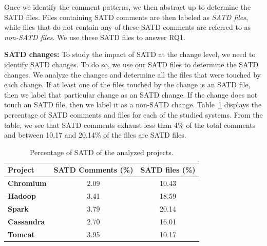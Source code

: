 Once we identify the comment patterns, we then abstract up to determine the SATD files. Files containing SATD comments are then labeled as {\em SATD files}, while files that do not contain any of these SATD comments are referred to as {\em non-SATD files}. We use these SATD files to answer RQ1.

\noindent\textbf{SATD changes:}
To study the impact of SATD at the change level, we need to identify SATD changes. To do so, we use our SATD files to determine the SATD changes. We analyze the changes and determine all the files that were touched by each change. If at least one of the files touched by the change is an SATD file, then we label that particular change as an SATD change. If the change does not touch an SATD file, then we label it as a non-SATD change. Table~\ref{table:satd_analyzed_projects} displays the percentage of SATD comments and files for each of the studied systems. From the table, we see that SATD comments exhaust less than 4\% of the total comments and between 10.17 and 20.14\% of the files are SATD files.

\begin{table}[tbh]
	\setlength{\tabcolsep}{.7\tabcolsep}
	\centering
	\caption{Percentage of SATD of the analyzed projects.}
	\begin{tabular}{l|c|c}
		\hline
		\textbf{Project}   & \textbf{SATD Comments (\%)} & \textbf{SATD files (\%)} \\ \hline
		\textbf{Chromium}  & 2.09             & 10.43                             \\ \hline
		\textbf{Hadoop}    & 3.41             & 18.59                             \\ \hline
		\textbf{Spark}     & 3.79             & 20.14                             \\ \hline
		\textbf{Cassandra} & 2.70             & 16.01                             \\ \hline
		\textbf{Tomcat}    & 3.95             & 10.17                             \\ \hline
	\end{tabular}
	\label{table:satd_analyzed_projects}
	\vspace{-0.2cm}
\end{table}


